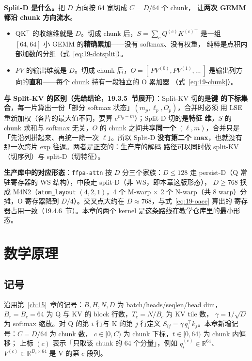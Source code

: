 \textbf{Split-D 是什么。}把 $D$ 方向按 64 宽切成 $C = D/64$ 个 chunk，
让\textbf{两次 GEMM 都沿 chunk 方向流水}。

\begin{itemize}[itemsep=2pt,topsep=2pt]
  \item QK${}^\top$ 的收缩维就是 $D$。切成 chunk 后，$S = \sum_c Q^{(c)} K^{(c)\top}$
        是一组 $[64,64]$ 小 GEMM 的\textbf{精确累加}——没有 softmax、没有权重，
        纯粹是点积内部加数的分组（式~\ref{eq:19-dotsplit}）。
  \item $PV$ 的输出维就是 $D$。切成 chunk 后，$O = [\,P V^{(0)}, P V^{(1)}, \dots\,]$
        是输出列方向的\textbf{直和}——每个 chunk 持有一段独立的 O 累加器
        （式~\ref{eq:19-chunk}）。
\end{itemize}

\textbf{与 Split-KV 的区别（先给结论，19.3.5~节展开）}：Split-KV 切的是\textbf{键
的下标集合}，每一片算出一份「部分 softmax 状态」$(m_p, \ell_p, O_p)$，合并时必须
用 LSE 重新加权（各片的最大值不同，要算 $e^{m_p - m}$）；Split-D 切的是\textbf{特征
维}，$S$ 的 chunk 求和与 softmax 无关，$O$ 的 chunk 之间共享\textbf{同一个}
$(\ell, m)$，合并只是「先沿列拼起来、再统一除一次 $\ell$」。所以 Split-D
\textbf{没有第二个 max}，也就没有那一次跨片 exp 往返。两者是正交的：生产库的解码
路径可以同时做 split-KV（切序列）与 split-D（切特征）。

\textbf{生产库中的对应形态}：\texttt{ffpa-attn} 按 $D$ 分三个家族：$D \le 128$ 走
persist-D（Q 常驻寄存器的 WS 结构），中段走 split-D（非 WS，即本章这版形态），
$D \ge 768$ 换成 M4N2（\texttt{atom\_layout} $(4,2,1)$，4 个 M-warp $\times$ 2 个
N-warp（共 8 warp）分摊，O 寄存器降到 $D/4$）。交叉点大约在 $D \approx 768$，与式~\ref{eq:19-oacc} 算出的
寄存器占用一致（19.4.6~节）。本章的两个 kernel 是这条路线在教学仓库里的最小形态。

\section{数学原理}

\subsection{记号}

沿用第~\ref{ch:15}~章的记号：$B, H, N, D$ 为 batch/heads/seqlen/head dim，
$B_r = B_c = 64$ 为 Q 与 KV 的 block 行数，$T_c = N/B_c$ 为 KV tile 数，
$\gamma = 1/\sqrt D$ 为 softmax 缩放。对 Q 的第 $i$ 行与 K 的第 $j$ 行定义
$S_{ij} = \gamma\, q_i^\top k_j$。本章新增记号：$C = D/64$ 为 chunk 数，
$c \in [0, C)$ 为 chunk 下标，$t \in [0, 64)$ 为 chunk 内偏移；
上标 $(c)$ 表示「只取该 chunk 的 64 个分量」，例如
$q_i^{(c)} \in \mathbb{R}^{64}$、
$V^{(c)} \in \mathbb{R}^{B_c \times 64}$ 是 V 的第 $c$ 段列。

